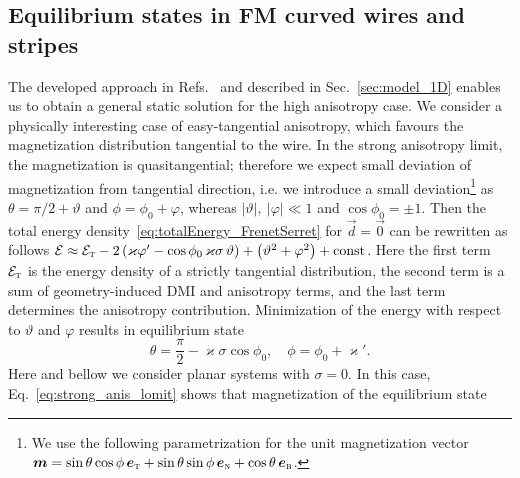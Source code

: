 \documentclass[runningheads]{llncs}
\begin{document}
\subsection{Equilibrium states in FM curved wires and stripes}\label{sec:statics}

The developed approach in Refs.~\cite{Sheka15,Volkov18} and described in Sec.~\ref{sec:model_1D} enables us to obtain a general static solution for the high anisotropy case. We consider a physically interesting case of easy-tangential anisotropy, which favours the magnetization distribution tangential to the wire. In the strong anisotropy limit, the magnetization is quasitangential; therefore we expect small deviation of magnetization from tangential direction, i.e. we introduce a small deviation\footnote{We use the following parametrization for the unit magnetization vector $\vec{m}=\sin\theta\cos\phi\,\vec{e}_\textsc{t}+\sin\theta\sin\phi\,\vec{e}_\textsc{n}+\cos\theta\,\vec{e}_\textsc{b}$.} as $\theta=\pi/2+\vartheta$ and $\phi=\phi_0+\varphi$, whereas $|\vartheta|,\ |\varphi|\ll1$ and $\cos\phi_0=\pm1$. Then the total energy density~\eqref{eq:totalEnergy_FrenetSerret} for $\vec{d}=\vec{0}$ can be rewritten as follows $\mathcal{E} \approx \mathcal{E}_\textsc{t}-2\left(\varkappa\varphi'-\cos\phi_0\, \varkappa\sigma\,\vartheta\right)+\left(\vartheta^2+\varphi^2\right)+\text{const}$. Here the first term~$\mathcal{E}_\textsc{t}$ is the energy density of a strictly tangential distribution, the second term is a sum of geometry-induced DMI and anisotropy terms, and the last term determines the anisotropy contribution. Minimization of the energy with respect to $\vartheta$ and $\varphi$ results in equilibrium state
\begin{equation}\label{eq:strong_anis_lomit}
\theta=\frac{\pi}{2}-\varkappa\sigma\cos\phi_0,\quad \phi=\phi_0+\varkappa'.
\end{equation}
Here and bellow we consider planar systems with $\sigma=0$. In this case, Eq.~\eqref{eq:strong_anis_lomit} shows that magnetization of the equilibrium state
\end{document}
